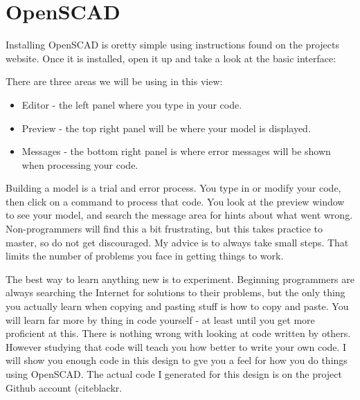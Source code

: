 \section*{OpenSCAD}

Installing OpenSCAD is oretty simple using instructions found on the projects
website. Once it is installed, open it up and take a look at the basic
interface:


There are three areas we will be using in this view:

\begin{itemize}
\item{Editor - the left panel where you type in your code.}
\item{Preview - the top right panel will be where your model is displayed.}
\item{Messages - the bottom right panel is where error messages will be shown
when processing your code.} \end{itemize}

Building a model is a trial and error process. You type in or modify your code,
then click on a command to process that code. You look at the preview window to
see your model, and search the message area for hints about what went wrong.
Non-programmers will find this a bit frustrating, but this takes practice to
master, so do not get discouraged. My advice is to always take small steps.
That limits the number of problems you face in getting things to work.

The best way to learn anything new is to experiment. Beginning programmers are
always searching the Internet for solutions to their problems, but the only
thing you actually learn when copying and pasting stuff is how to copy and
paste. You will learn far more by thing in code yourself - at least until you
get more proficient at this. There is nothing wrong with looking at code
written by others. However studying that code will teach you how better to
write your own code. I will show you enough code in this design to gve you a feel
for how you do things using OpenSCAD. The actual code I generated for this
design is on the project Github account (cite{blackr}.
